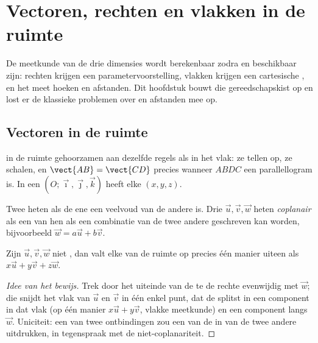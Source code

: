 \chapter{Vectoren, rechten en vlakken in de ruimte}\label{ch:g12:space}

De meetkunde van de drie dimensies wordt berekenbaar zodra  en
 beschikbaar zijn: rechten krijgen een parametervoorstelling,
vlakken krijgen een cartesische , en het  meet
hoeken en afstanden. Dit hoofdstuk bouwt die gereedschapskist op en lost er de
klassieke problemen over  en afstanden mee op.

\section{Vectoren in de ruimte}

 in de ruimte gehoorzamen aan dezelfde regels als in het vlak: ze
tellen op, ze schalen, en $\vect{AB} = \vect{CD}$ precies wanneer $ABDC$ een
parallellogram is. In een  $(O; \vec\imath, \vec\jmath, \vec k)$
heeft elke   $(x, y, z)$.

\begin{definition}\label{def:g12:space:collinear}
Twee  heten \emph{} als de ene een veelvoud van de andere
is. Drie  $\vec u, \vec v, \vec w$ heten
\emph{coplanair} als een van hen als een combinatie van de
twee andere geschreven kan worden, bijvoorbeeld
$\vec w = a\vec u + b\vec v$.
\end{definition}

\begin{proposition}\label{prop:g12:space:basis}
Zijn $\vec u, \vec v, \vec w$ niet , dan valt elke  van de
ruimte op precies één manier uiteen als $x\vec u + y\vec v + z\vec w$.
\end{proposition}

\begin{proof}[Idee van het bewijs]
Trek door het uiteinde van de te   de rechte evenwijdig met
$\vec w$; die snijdt het vlak van $\vec u$ en $\vec v$ in één enkel punt, dat
de  splitst in een component in dat vlak (op één manier
$x\vec u + y\vec v$, vlakke meetkunde) en een component langs $\vec w$.
Uniciteit: een  van twee ontbindingen zou een van de  in
 van de twee andere uitdrukken, in tegenspraak met de
niet-coplanariteit.
\end{proof}

